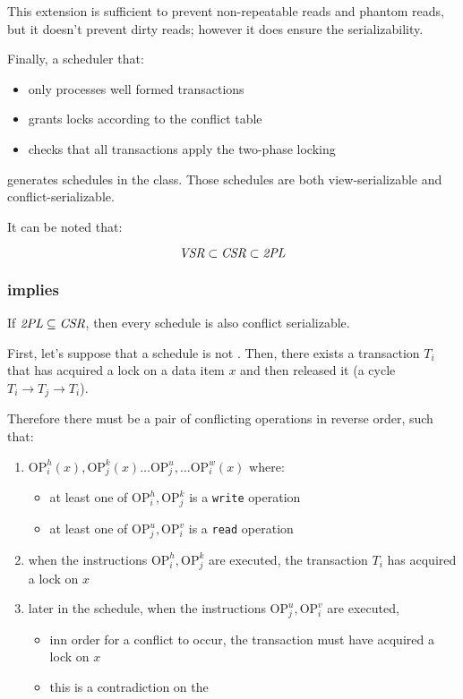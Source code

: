 \documentclass[english]{article}
\begin{document}
This extension is sufficient to prevent non-repeatable reads and phantom reads, but it doesn't prevent dirty reads;
however it does ensure the serializability.

\bigskip
Finally, a scheduler that:

\begin{itemize}
  \item only processes well formed transactions
  \item grants locks according to the conflict table
  \item checks that all transactions apply the two-phase locking
\end{itemize}

generates schedules in the \TPL class.
Those schedules are both view-serializable and conflict-serializable.

It can be noted that:

\[ \textit{VSR} \subset \textit{CSR} \subset \textit{2PL} \]

\subsubsection{\TPL implies \CSR}

If \(\textit{2PL} \subseteq \textit{CSR}\), then every \TPL schedule is also conflict serializable.

\bigskip
First, let's suppose that a \TPL schedule is not \CSR.
Then, there exists a transaction \(T_i\) that has acquired a lock on a data item \(x\) and then released it (a cycle \(T_i \rightarrow T_j \rightarrow T_i\)).

Therefore there must be a pair of conflicting operations in reverse order, such that:

\begin{enumerate}
  \item \(\text{OP}_{i}^{h}(x), \text{OP}_{j}^{k}(x) \ldots \text{OP}_{j}^{u}, \ldots \text{OP}_{i}^{w}(x)\) where:
        \begin{itemize}
          \item at least one of \(\text{OP}_{i}^{h}, \text{OP}_{j}^{k}\) is a \texttt{write} operation
          \item at least one of \(\text{OP}_{j}^{u}, \text{OP}_{i}^{v}\) is a \texttt{read} operation
        \end{itemize}
  \item when the instructions \(\text{OP}_{i}^{h}, \text{OP}_{j}^{k}\) are executed, the transaction \(T_i\) has acquired a lock on \(x\)
  \item later in the schedule, when the instructions \(\text{OP}_{j}^{u}, \text{OP}_{i}^{v}\) are executed,
        \begin{itemize}
          \item inn order for a conflict to occur, the transaction must have acquired a lock on \(x\)
          \item this is a contradiction on the \TPL
        \end{itemize}
\end{enumerate}
\end{document}
